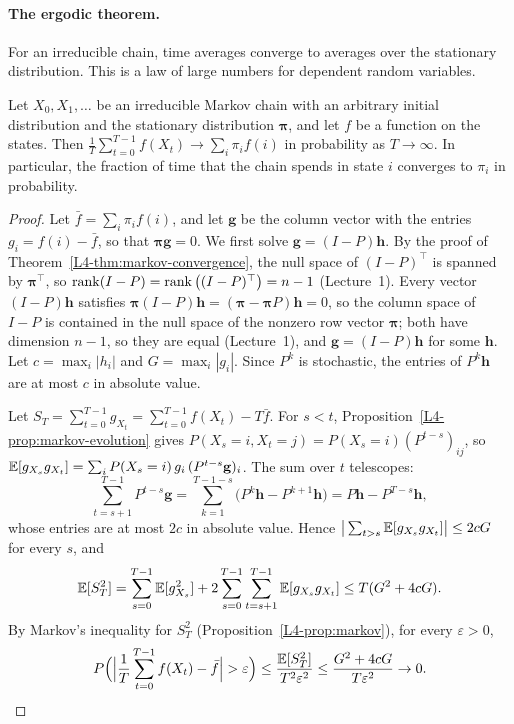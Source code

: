 \paragraph{The ergodic theorem.} For an irreducible chain, time averages converge to averages over the stationary distribution. This is a law of large numbers for dependent random variables.

\begin{theorem}\label{L4-thm:ergodic}
    Let $X_0, X_1, \ldots$ be an irreducible Markov chain with an arbitrary initial distribution and the stationary distribution $\boldsymbol{\pi}$, and let $f$ be a function on the states. Then $\frac{1}{T}\sum_{t=0}^{T-1} f(X_t) \to \sum_i \pi_i f(i)$ in probability as $T \to \infty$. In particular, the fraction of time that the chain spends in state $i$ converges to $\pi_i$ in probability.
\end{theorem}

\begin{proof}
    Let $\bar f = \sum_i \pi_i f(i)$, and let $\mathbf{g}$ be the column vector with the entries $g_i = f(i) - \bar f$, so that $\boldsymbol{\pi}\mathbf{g} = 0$. We first solve $\mathbf{g} = (I - P)\mathbf{h}$. By the proof of Theorem~\ref{L4-thm:markov-convergence}, the null space of $(I - P)^\top$ is spanned by $\boldsymbol{\pi}^\top$, so $\operatorname{rank}(I - P) = \operatorname{rank}\big((I - P)^\top\big) = n - 1$ (Lecture~1). Every vector $(I - P)\mathbf{h}$ satisfies $\boldsymbol{\pi}(I - P)\mathbf{h} = (\boldsymbol{\pi} - \boldsymbol{\pi}P)\mathbf{h} = 0$, so the column space of $I - P$ is contained in the null space of the nonzero row vector $\boldsymbol{\pi}$; both have dimension $n - 1$, so they are equal (Lecture~1), and $\mathbf{g} = (I - P)\mathbf{h}$ for some $\mathbf{h}$. Let $c = \max_i |h_i|$ and $G = \max_i |g_i|$. Since $P^k$ is stochastic, the entries of $P^k\mathbf{h}$ are at most $c$ in absolute value.

    Let $S_T = \sum_{t=0}^{T-1} g_{X_t} = \sum_{t=0}^{T-1} f(X_t) - T\bar f$. For $s < t$, Proposition~\ref{L4-prop:markov-evolution} gives $P(X_s = i, X_t = j) = P(X_s = i)(P^{t-s})_{ij}$, so $\mathbb{E}[g_{X_s}g_{X_t}] = \sum_i P(X_s = i)\,g_i\,(P^{t-s}\mathbf{g})_i$. The sum over $t$ telescopes:
    \[\sum_{t=s+1}^{T-1} P^{t-s}\mathbf{g} = \sum_{k=1}^{T-1-s} \big(P^k\mathbf{h} - P^{k+1}\mathbf{h}\big) = P\mathbf{h} - P^{T-s}\mathbf{h},\]
    whose entries are at most $2c$ in absolute value. Hence $\big|\sum_{t > s}\mathbb{E}[g_{X_s}g_{X_t}]\big| \leq 2cG$ for every $s$, and
    \[\mathbb{E}[S_T^2] = \sum_{s=0}^{T-1}\mathbb{E}[g_{X_s}^2] + 2\sum_{s=0}^{T-1}\sum_{t=s+1}^{T-1}\mathbb{E}[g_{X_s}g_{X_t}] \leq T(G^2 + 4cG).\]
    By Markov's inequality for $S_T^2$ (Proposition~\ref{L4-prop:markov}), for every $\varepsilon > 0$,
    \[P\Big(\Big|\frac{1}{T}\sum_{t=0}^{T-1} f(X_t) - \bar f\Big| > \varepsilon\Big) \leq \frac{\mathbb{E}[S_T^2]}{T^2\varepsilon^2} \leq \frac{G^2 + 4cG}{T\varepsilon^2} \to 0. \qedhere\]
\end{proof}

